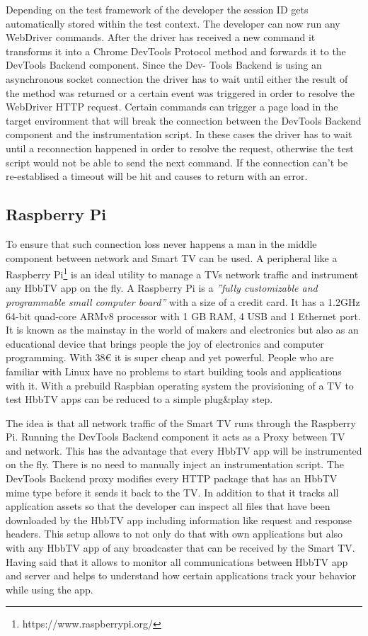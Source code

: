 Depending on the test framework of the developer the session ID gets automatically stored within the test context. The developer can now run any WebDriver commands. After the driver has received a new command it transforms it into a Chrome DevTools Protocol method and forwards it to the DevTools Backend component. Since the Dev- Tools Backend is using an asynchronous socket connection the driver has to wait until either the result of the method was returned or a certain event was triggered in order to resolve the WebDriver HTTP request. Certain commands can trigger a page load in the target environment that will break the connection between the DevTools Backend component and the instrumentation script. In these cases the driver has to wait until a reconnection happened in order to resolve the request, otherwise the test script would not be able to send the next command. If the connection can't be re-establised a timeout will be hit and causes to return with an error.

\subsection{Raspberry Pi\label{sec:pi}}

To ensure that such connection loss never happens a man in the middle component between network and Smart TV can be used. A peripheral like a Raspberry Pi\footnote{https://www.raspberrypi.org/} is an ideal utility to manage a TVs network traffic and instrument any HbbTV app on the fly. A Raspberry Pi is a \textit{''fully customizable and programmable small computer board''}\cite{raspberrypi} with a size of a credit card. It has a 1.2GHz 64-bit quad-core ARMv8 processor with 1 GB RAM, 4 USB and 1 Ethernet port. It is known as the mainstay in the world of makers and electronics but also as an educational device that brings people the joy of electronics and computer programming. With 38\euro{} it is super cheap and yet powerful. People who are familiar with Linux have no problems to start building tools and applications with it. With a prebuild Raspbian operating system the provisioning of a TV to test HbbTV apps can be reduced to a simple plug\&play step.

The idea is that all network traffic of the Smart TV runs through the Raspberry Pi. Running the DevTools Backend component it acts as a Proxy between TV and network. This has the advantage that every HbbTV app will be instrumented on the fly. There is no need to manually inject an instrumentation script. The DevTools Backend proxy modifies every HTTP package that has an HbbTV mime type before it sends it back to the TV. In addition to that it tracks all application assets so that the developer can inspect all files that have been downloaded by the HbbTV app including information like request and response headers. This setup allows to not only do that with own applications but also with any HbbTV app of any broadcaster that can be received by the Smart TV. Having said that it allows to monitor all communications between HbbTV app and server and helps to understand how certain applications track your behavior while using the app.

